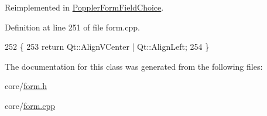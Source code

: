 Reimplemented in \hyperlink{classPopplerFormFieldChoice_ac39cea55f97a8033937e61ce4e04c70f}{Poppler\+Form\+Field\+Choice}.



Definition at line 251 of file form.\+cpp.


\begin{DoxyCode}
252 \{
253     \textcolor{keywordflow}{return} Qt::AlignVCenter | Qt::AlignLeft;
254 \}
\end{DoxyCode}


The documentation for this class was generated from the following files\+:\begin{DoxyCompactItemize}
\item 
core/\hyperlink{form_8h}{form.\+h}\item 
core/\hyperlink{form_8cpp}{form.\+cpp}\end{DoxyCompactItemize}
